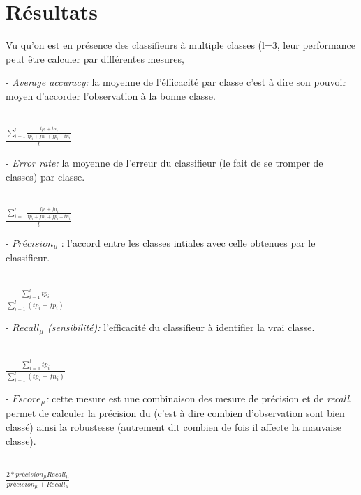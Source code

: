 \documentclass{article}
\numberwithin{equation}{section}
\begin{document}

\section{Résultats}

Vu qu'on est en présence des classifieurs à multiple classes (l=3, leur performance peut être calculer par différentes mesures,

- \textit{Average accuracy:} la moyenne de l'éfficacité par classe c'est à dire son pouvoir moyen d'accorder l'observation à la bonne classe. \\\\
\begin{center}
$\frac{\sum_{i=1}^{l} \frac{tp_i +tn_i}{tp_i + fn_i + fp_i+ tn_i}}{l}$
\end{center}

- \textit{Error rate:} la moyenne de l'erreur du classifieur (le fait de se tromper de classes) par classe.\\ \\
\begin{center}
$\frac{\sum_{i=1}^{l} \frac{fp_i +fn_i}{tp_i + fn_i + fp_i+ tn_i}}{l}$
\end{center}

- $Précision_{\mu}$ : l'accord entre les classes intiales avec celle obtenues par le classifieur. \\\\
\begin{center}
$\frac{\sum_{i=1}^{l} tp_i}{\sum_{i=1}^{l} (tp_i + fp_i)}$
\end{center}

- \textit{$Recall_{\mu}$ (sensibilité):} l'efficacité du classifieur à identifier la vrai classe.\\\\
\begin{center}
$\frac{\sum_{i=1}^{l} tp_i}{\sum_{i=1}^{l} (tp_i + fn_i)}$
\end{center}

- \textit{$F score_{\mu}$:} cette mesure est une combinaison des mesure de précision et de \textit{recall}, permet de calculer la précision du (c'est à dire combien d'observation sont bien classé) ainsi la robustesse (autrement dit combien de fois il affecte la mauvaise classe).\\\\
\begin{center}
$\frac{2 * précision_{\mu} Recall_{\mu}}{précision_{\mu} + Recall_{\mu}}$
\end{center}
\end{document}
